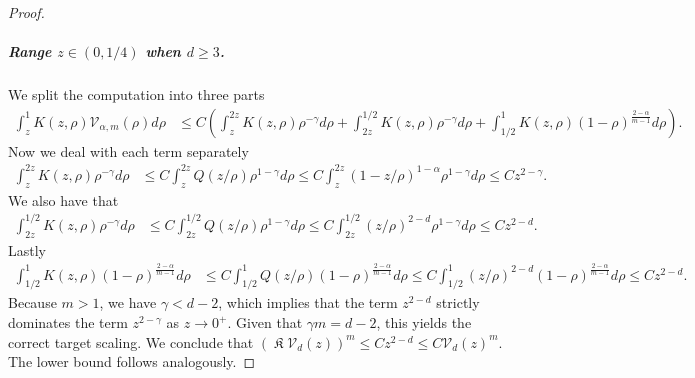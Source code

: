 \documentclass[10pt,a4paper]{amsart}
\DeclareMathOperator{\fixedpoint}{\mathfrak K}
\begin{document}
\begin{proof}
\subparagraph{Range $z \in (0,1/4)$ when $d \ge 3$.}
We split the computation into three parts
\begin{align*}
  \int_z^1 K(z,\rho) \mathcal V_{\alpha,m} (\rho) d \rho
  & \le C\left( \int_z^{2z}  K(z, \rho) \rho^{-\gamma} d \rho
    + \int_{2z}^{1/2}   K(z, \rho) \rho^{-\gamma} d \rho
  + \int_{1/2}^{1}  K(z, \rho) (1-\rho)^{\frac{2-\alpha}{m-1}} d \rho \right).
\end{align*}
Now we deal with each term separately
\begin{align*}
  \int_z^{2z}  K(z, \rho) \rho^{-\gamma} d \rho
  & \le C \int_z^{2z}  Q(z/ \rho) \rho^{1-\gamma} d \rho
  \le C\int_z^{2z}  (1 - z/\rho)^{1-\alpha}  \rho^{1-\gamma} d \rho
  \le C z^{2-\gamma}.
\end{align*}
We also have that
\begin{align*}
  \int_{2z}^{1/2}   K(z, \rho) \rho^{-\gamma} d \rho
  & \le C \int_{2z}^{1/2}   Q(z/\rho) \rho^{1-\gamma} d \rho
  \le C \int_{2z}^{1/2}(z/\rho)^{2-d}\rho^{1-\gamma} d \rho
  \le C z^{2-d} .
\end{align*}
Lastly
\begin{align*}
  \int_{1/2}^{1}  K(z, \rho) (1-\rho)^{\frac{2-\alpha}{m-1}} d \rho
  & \le C \int_{1/2}^{1}  Q(z/\rho) (1-\rho)^{\frac{2-\alpha}{m-1}} d \rho
  \le C \int_{1/2}^{1} (z/\rho)^{2-d} (1-\rho)^{\frac{2-\alpha}{m-1}} d \rho
  \le Cz^{2-d}.
\end{align*}
Because $m > 1$, we have $\gamma < d-2$, which implies that the term $z^{2-d}$ strictly dominates the term $z^{2-\gamma}$ as $z \to 0^+$. Given that $\gamma m = d-2$, this yields the correct target scaling. We conclude that $(\fixedpoint\mathcal{V}_d(z))^m \le C z^{2-d} \le C \mathcal{V}_d(z)^m$. The lower bound follows analogously.


\end{proof}
\end{document}
